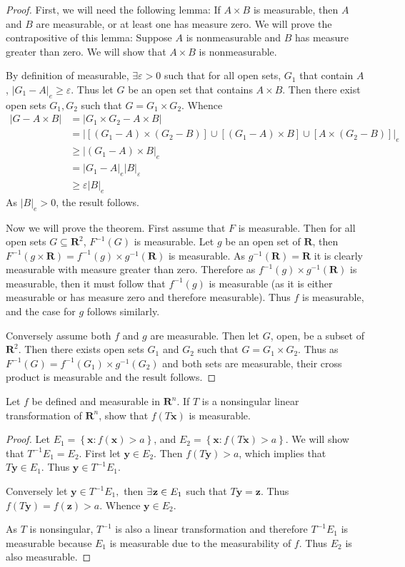 \documentclass[12pt]{book}
\newcommand{\st}{\bf{:}}
\newcommand{\set}[1]{\left\{ #1 \right\}}
\renewcommand{\u}{\cup}
\renewcommand{\ss}{\subseteq}
\newcommand{\inv}{^{-1}}
\newcommand{\cross}{\times}
\newcommand{\x}{\mathbf{x}}
\newcommand{\y}{\mathbf{y}}
\newcommand{\z}{\mathbf{z}}
\newcommand{\R}{\mathbf{R}}
\renewcommand{\.}{\mkern1mu}
\newcounter{case}
\newcommand{\e}{\varepsilon}
\newcommand{\abs}[1]{\left| #1 \right|}
\newenvironment{pf}{\begin{proof}\setlength{\parindent}{\normalparindent}\setlength{\parskip}{\normalparskip}}{\end{proof}}
\theoremstyle{theorem}
\renewcommand{\bf}[1]{\boldsymbol{#1}}
\newlength{\normalparindent}
\newlength{\normalparskip}
\begin{document}
	\begin{proof}
	First, we will need the following lemma: If $A\cross B$ is measurable, then $A$ and $B$ are measurable, or at least one has measure zero. We will prove the contrapositive of this lemma: Suppose $A$ is nonmeasurable and $B$ has measure greater than zero. We will show that $A\cross B$ is nonmeasurable.
	
	By definition of measurable, $\exists \e>0$ such that for all open sets, $G_1$ that contain $A$, $\abs{G_1 - A}_e \geq \e$. Thus let $G$ be an open set that contains $A\cross B$. Then there exist open sets $G_1, G_2$ such that $G = G_1 \cross G_2$. Whence
		\begin{align*}
		\abs{G - A\cross B} &= \abs{G_1\cross G_2 - A\cross B}\\
			&= \abs{[(G_1 - A)\cross (G_2 - B)] \u [(G_1-A)\cross B] \u [A \cross (G_2 - B)]}_e\\
			&\geq \abs{(G_1-A)\cross B}_e\\
			&= \abs{G_1-A}_e\abs{B}_\e\\
			&\geq \e\abs{B}_e
		\end{align*}	
	As $\abs{B}_e > 0$, the result follows.	 
	
	Now we will prove the theorem. First assume that $F$ is measurable. Then for all open sets $G \ss \R^2$, $F^{-1}(G)$ is measurable. Let $g$ be an open set of $\R$, then $F^{-1}(g\cross \R) = f^{-1}(g) \cross g^{-1}(\R)$ is measurable. As $g\inv(\R) = \R$ it is clearly measurable with measure greater than zero. Therefore as $f\inv(g)\cross g\inv(\R)$ is measurable, then it must follow that $f\inv(g)$ is measurable (as it is either measurable or has measure zero and therefore measurable). Thus $f$ is measurable, and the case for $g$ follows similarly.
	
	Conversely assume both $f$ and $g$ are measurable. Then let $G$, open, be a subset of $\R^2$. Then there exists open sets $G_1$ and $G_2$ such that $G = G_1 \cross G_2$. Thus as $F\inv(G) = f\inv(G_1) \cross g\inv(G_2)$ and both sets are measurable, their cross product is measurable and the result follows.
	\end{proof}	 

\item Let $f$ be defined and measurable in $\R^n$. If $T$ is a nonsingular linear transformation of $\R^n$, show that $f(T\x)$ is measurable. 
	\begin{pf}
	Let $E_1 = \set{\x\st f(\x)>a}$, and $E_2 =\set{\x\st f(T\x) > a}.$ We will show that $T\inv E_1 = E_2$. First let $\y\in E_2$. Then $f(T\y) > a$, which implies that $T\y\in E_1.$ Thus $\y\in T\inv E_1.$
	
	Conversely let $\y\in T\inv E_1,$ then $\exists\. \z\in E_1$ such that $T\y = \z$. Thus $f(T\y) = f(\z) > a.$ Whence $\y\in E_2.$
	
	As $T$ is nonsingular, $T\inv$ is also a linear transformation and therefore $T\inv E_1$ is measurable because $E_1$ is measurable due to the measurability of $f$. Thus $E_2$ is also measurable.
	\end{pf}
	
\end{document}
